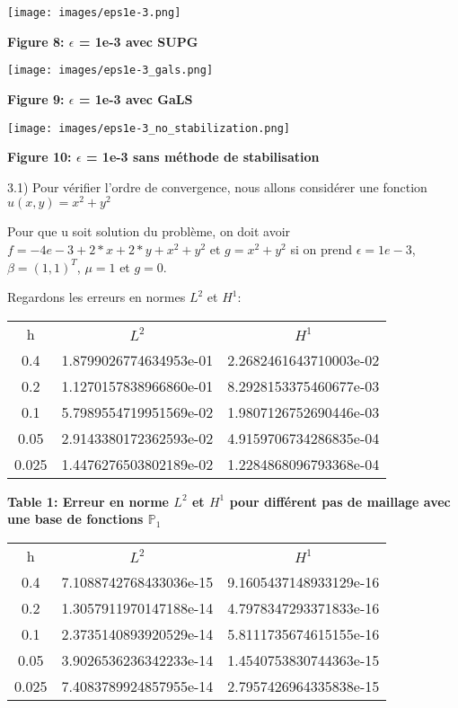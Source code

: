 \documentclass{article}
\begin{document}
\texttt{[image: images/eps1e-3.png]}
\begin{center}
    \textbf{Figure 8: $\epsilon$ = 1e-3 avec SUPG}
\end{center}
\texttt{[image: images/eps1e-3\_gals.png]}
\begin{center}
    \textbf{Figure 9: $\epsilon$ = 1e-3 avec GaLS}
\end{center}
\texttt{[image: images/eps1e-3\_no\_stabilization.png]}
\begin{center}
    \textbf{Figure 10: $\epsilon$ = 1e-3 sans méthode de stabilisation}
\end{center}

3.1) Pour vérifier l'ordre de convergence, nous allons considérer une fonction $u(x,y) = x^2+y^2$

Pour que u soit solution du problème, on doit avoir $f = -4e-3+2*x+2*y+x^2+y^2$ et $g = x^2+y^2$ si on prend $\epsilon = 1e-3$, $\beta = (1,1)^T$, $\mu = 1$ et $g=0$.

Regardons les erreurs en normes $L^2$ et $H^1$:

\begin{tabular}{c|c|c}
    h & $L^2$ & $H^1$ \\
    0.4   &  1.8799026774634953e-01 &  2.2682461643710003e-02 \\
    0.2   &  1.1270157838966860e-01 &  8.2928153375460677e-03 \\
    0.1   &  5.7989554719951569e-02 &  1.9807126752690446e-03 \\
    0.05  &  2.9143380172362593e-02 &  4.9159706734286835e-04 \\
    0.025 &  1.4476276503802189e-02 & 1.2284868096793368e-04
\end{tabular}

\textbf{Table 1: Erreur en norme $L^2$ et $H^1$ pour différent pas de maillage avec une base de fonctions $\mathbb{P}_1$}

\begin{tabular}{c|c|c}
    h & $L^2$ & $H^1$ \\
    0.4   &  7.1088742768433036e-15 &  9.1605437148933129e-16 \\
    0.2   &  1.3057911970147188e-14 &  4.7978347293371833e-16 \\
    0.1   &  2.3735140893920529e-14 &  5.8111735674615155e-16 \\
    0.05  &  3.9026536236342233e-14 &  1.4540753830744363e-15 \\
    0.025 &  7.4083789924857955e-14 &  2.7957426964335838e-15
\end{tabular}
\end{document}
